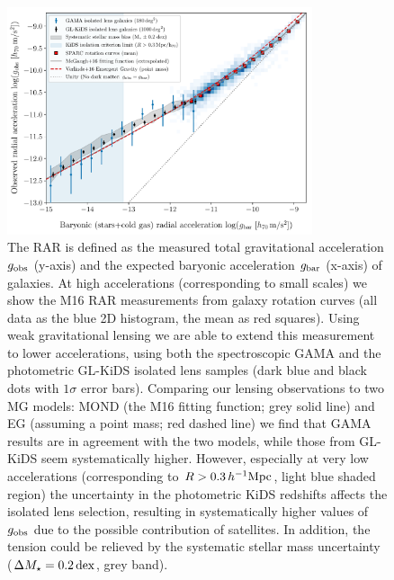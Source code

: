 \documentclass[usenatbib]{mnras}
\newcommand{\hMpc}{\, h^{-1}{\rm{Mpc}} }
\newcommand{\un}[1]{_{\rm #1}}
\newcommand{\dex}{\, {\rm dex}}
\begin{document}
\begin{figure}
	\includegraphics[width=0.8\textwidth]{Figures/RAR_KiDS+GAMA+Verlinde_Nobins_isolated_zoomout.pdf}
	\caption{The RAR is defined as the measured total gravitational acceleration $g\un{obs}$ (y-axis) and the expected baryonic acceleration $g\un{bar}$ (x-axis) of galaxies. At high accelerations (corresponding to small scales) we show the M16 RAR measurements from galaxy rotation curves (all data as the blue 2D histogram, the mean as red squares). Using weak gravitational lensing we are able to extend this measurement to lower accelerations, using both the spectroscopic GAMA and the photometric GL-KiDS isolated lens samples (dark blue and black dots with $1\sigma$ error bars). Comparing our lensing observations to two MG models: MOND (the M16 fitting function; grey solid line) and EG (assuming a point mass; red dashed line) we find that GAMA results are in agreement with the two models, while those from GL-KiDS seem systematically higher. However, especially at very low accelerations (corresponding to $R > 0.3 \hMpc$, light blue shaded region) the uncertainty in the photometric KiDS redshifts affects the isolated lens selection, resulting in systematically higher values of $g\un{obs}$ due to the possible contribution of satellites. In addition, the tension could be relieved by the systematic stellar mass uncertainty ($\Delta M_\star=0.2 \dex$, grey band).}
	\label{fig:RAR_kids_gama_verlinde}
\end{figure}
\end{document}
